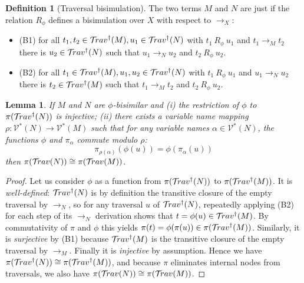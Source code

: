 \documentclass{article}
\theoremstyle{plain}
\newtheorem{lemma}[theorem]{Lemma}
\theoremstyle{definition}
\newtheorem{definition}{Definition}[section]
\theoremstyle{remark}
\newcommand\VarSet{\mathcal{V}}
\def\coresymbol{\pi} %
\begin{document}
\begin{definition}[Traversal bisimulation]
The two terms $M$ and $N$ are  just if the relation $R_\phi$ defines a bisimulation over $X$ with respect to $\rightarrow_X$:
\begin{itemize}
    \item (B1) for all $t_1, t_2 \in \mathcal{T}\!rav^\dagger(M), u_1 \in \mathcal{T}\!rav^\dagger(N)$ with $t_1~R_\phi~u_1$ and $t_1 \rightarrow_M t_2$ there is $u_2 \in \mathcal{T}\!rav^\dagger(N)$ such that $u_1 \rightarrow_N u_2$ and $t_2~R_\phi~u_2$.
    \item (B2) for all $t_1 \in \mathcal{T}\!rav^\dagger(M), u_1, u_2 \in \mathcal{T}\!rav^\dagger(N)$ with $t_1~R_\phi~u_1$ and $u_1 \rightarrow_N u_2$ there is $t_2 \in \mathcal{T}\!rav^\dagger(M)$ such that $t_1 \rightarrow_M t_2$ and $t_2~R_\phi~u_2$.
\end{itemize}
\end{definition}

\begin{lemma}
\label{lem:bisimulation_isomorphism}
If $M$ and $N$ are $\phi$-bisimilar and
(i) the restriction of $\phi$ to $\coresymbol(\travset^\dagger(N))$ is injective;
(ii) there exists a variable name mapping $\rho: \VarSet^*(N) \rightarrow \VarSet^*(M)$ such that for any variable names $\alpha\in\VarSet^*(N)$, the functions $\phi$ and $\coresymbol_\alpha$ commute modulo $\rho$:
$$ \coresymbol_{\rho(\alpha)}(\phi(u)) = \phi(\coresymbol_{\alpha}(u))$$
then $\coresymbol(\travset(N)) \cong \coresymbol(\travset(M))$.
\end{lemma}
\begin{proof}
Let us consider $\phi$ as a function from $\coresymbol(\travset^\dagger(N))$ to $\coresymbol(\travset^\dagger(M))$.
It is \emph{well-defined}: $\mathcal{T}\!rav^\dagger(N)$ is by definition the transitive closure of the empty traversal by $\rightarrow_N$, so for any traversal $u$ of $\mathcal{T}\!rav^\dagger(N)$, repeatedly applying (B2) for each step of its $\rightarrow_N$ derivation shows that $t = \phi(u) \in \mathcal{T}\!rav^\dagger(M)$. By commutativity of $\coresymbol$ and $\phi$ this yields $\coresymbol(t)=\phi(\coresymbol(u)) \in \coresymbol(\travset^\dagger(M))$.
Similarly, it is \emph{surjective} by (B1) because $\mathcal{T}\!rav^\dagger(M)$ is the transitive closure of the empty traversal by $\rightarrow_M$. Finally it is \emph{injective} by assumption.
Hence we have $\coresymbol(\travset^\dagger(N)) \cong \coresymbol(\travset^\dagger(M))$, and because $\coresymbol$ eliminates internal nodes from traversals, we also have $\coresymbol(\travset(N)) \cong \coresymbol(\travset(M))$.
\end{proof}
\end{document}
